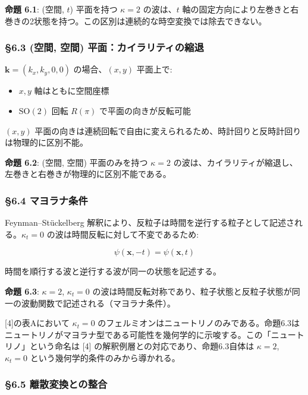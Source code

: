 \documentclass[
  a4paper,11pt]{ltjsarticle}
\providecommand{\tightlist}{%
  \setlength{\itemsep}{0pt}\setlength{\parskip}{0pt}}
\theoremstyle{definition}
\theoremstyle{remark}
\begin{document}
\textbf{命題 6.1}: (空間, \(t\)) 平面を持つ \(\kappa = 2\) の波は、\(t\)
軸の固定方向により左巻きと右巻きの2状態を持つ。この区別は連続的な時空変換では除去できない。

\subsubsection{§6.3 (空間, 空間)
平面：カイラリティの縮退}\label{ux7a7aux9593-ux7a7aux9593-ux5e73ux9762ux30abux30a4ux30e9ux30eaux30c6ux30a3ux306eux7e2eux9000}

\(\mathbf{k} = (k_x, k_y, 0, 0)\) の場合、\((x, y)\) 平面上で:

\begin{itemize}
\tightlist
\item
  \(x, y\) 軸はともに空間座標
\item
  \(\mathrm{SO}(2)\) 回転 \(R(\pi)\) で平面の向きが反転可能
\end{itemize}

\((x, y)\)
平面の向きは連続回転で自由に変えられるため、時計回りと反時計回りは物理的に区別不能。

\textbf{命題 6.2}: (空間, 空間) 平面のみを持つ \(\kappa = 2\)
の波は、カイラリティが縮退し、左巻きと右巻きが物理的に区別不能である。

\subsubsection{§6.4
マヨラナ条件}\label{ux30deux30e8ux30e9ux30caux6761ux4ef6}

Feynman--Stückelberg
解釈により、反粒子は時間を逆行する粒子として記述される。\(\kappa_t = 0\)
の波は時間反転に対して不変であるため:

\[\psi(\mathbf{x}, -t) = \psi(\mathbf{x}, t)\]

時間を順行する波と逆行する波が同一の状態を記述する。

\textbf{命題 6.3}: \(\kappa = 2\), \(\kappa_t = 0\)
の波は時間反転対称であり、粒子状態と反粒子状態が同一の波動関数で記述される（マヨラナ条件）。

{[}4{]}の表Aにおいて \(\kappa_t = 0\)
のフェルミオンはニュートリノのみである。命題6.3はニュートリノがマヨラナ型である可能性を幾何学的に示唆する。この「ニュートリノ」という命名は
{[}4{]} の解釈例層との対応であり、命題6.3自体は \(\kappa = 2\),
\(\kappa_t = 0\) という幾何学的条件のみから導かれる。

\subsubsection{§6.5
離散変換との整合}\label{ux96e2ux6563ux5909ux63dbux3068ux306eux6574ux5408}
\end{document}

